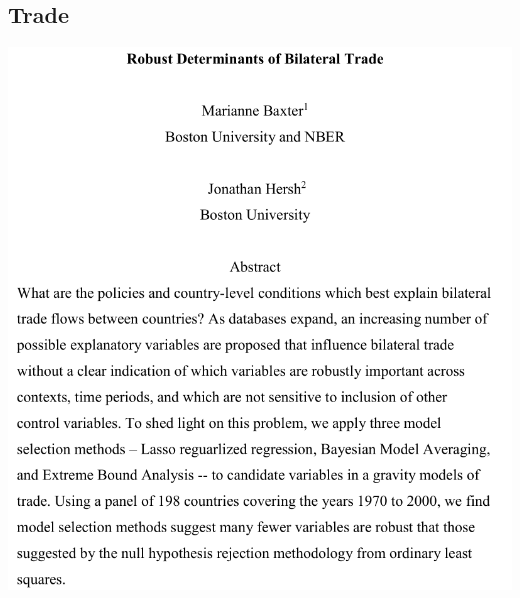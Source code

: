 \subsection{Trade}
\begin{frame}
    \vspace{-10pt}
    \begin{center}
    \includegraphics[height=0.85\textheight]{./resources/BaxterAbstract}
    \end{center}
    \nocite{baxter2017robust}
\end{frame}

